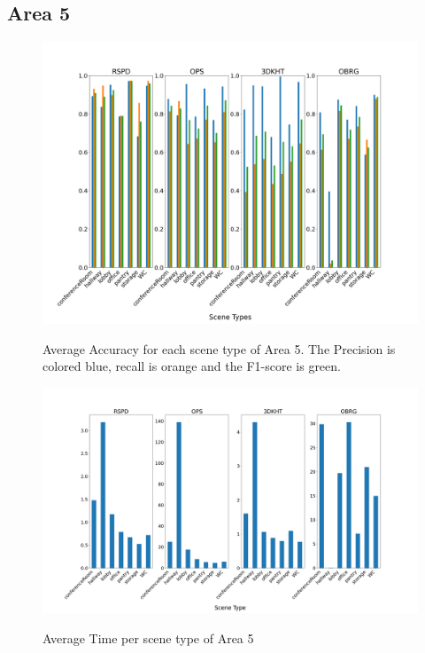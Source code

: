\documentclass[main.tex]{subfiles}
\begin{document}
\subsection{Area 5}

\begin{figure}[H]
    \centering
    \includegraphics[width=15 cm]{images/area_5_acc.png}
    \label{fig:area5A}
    \caption[Accuracies Area 4]{Average Accuracy for each scene type of Area 5. The Precision
        is colored blue, recall is orange and the F1-score is green. }
\end{figure}


\begin{figure}[H]
    \centering
    \includegraphics[width=15 cm]{images/area_5_time.png}
    \label{fig:area5T}
    \caption[Times Area 5]{Average Time per scene type of Area 5}
\end{figure}
\end{document}
